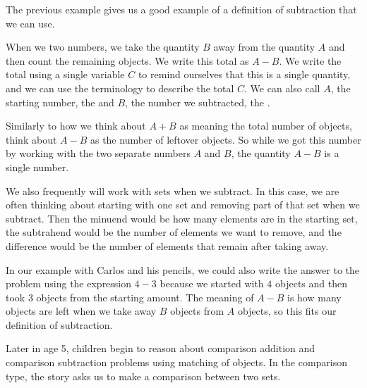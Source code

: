 \documentclass{ximera}
\begin{document}
The previous example gives us a good example of a definition of subtraction that we can use.

\begin{definition}
When we  two numbers, we take the quantity $B$ away from the quantity $A$ and then count the remaining objects. We write this total as $A - B$. We write the total using a single variable $C$ to remind ourselves that this is a single quantity, and we can use the terminology  to describe the total $C$. We can also call $A$, the starting number, the  and $B$, the number we subtracted, the .
\begin{image}
\end{image}
\end{definition}

Similarly to how we think about $A+B$ as meaning the total number of objects, think about $A-B$ as the number of leftover objects. So while we got this number by working with the two separate numbers $A$ and $B$, the quantity $A-B$ is a single number. 

We also frequently will work with sets when we subtract. In this case, we are often thinking about starting with one set and removing part of that set when we subtract. Then the minuend would be how many elements are in the starting set, the subtrahend would be the number of elements we want to remove, and the difference would be the number of elements that remain after taking away.

In our example with Carlos and his pencils, we could also write the answer to the problem using the expression $4-3$ because we started with $4$ objects and then took $3$ objects from the starting amount. The meaning of $A-B$ is how many objects are left when we take away $B$ objects from $A$ objects, so this fits our definition of subtraction.


Later in age 5, children begin to reason about comparison addition and comparison subtraction problems using matching of objects. In the comparison type, the story asks us to make a comparison between two sets.
\end{document}
